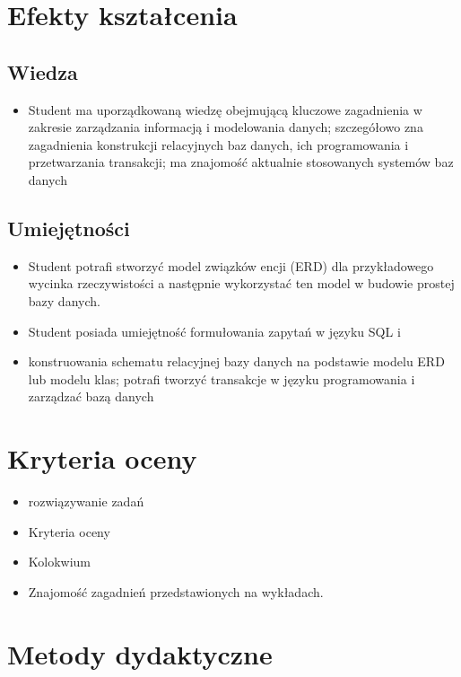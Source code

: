 \documentclass[12pt, a4paper]{article}
\begin{document}
\section{Efekty kształcenia}

\subsection*{Wiedza}
\begin{itemize}
  \item Student ma uporządkowaną wiedzę obejmującą kluczowe zagadnienia w zakresie zarządzania informacją i modelowania danych; szczegółowo zna zagadnienia konstrukcji relacyjnych baz danych, ich programowania i przetwarzania transakcji; ma znajomość aktualnie stosowanych systemów baz danych
\end{itemize}

\subsection*{Umiejętności}
\begin{itemize}
  \item Student potrafi stworzyć model związków encji (ERD) dla przykładowego wycinka rzeczywistości a następnie wykorzystać ten model w budowie prostej bazy danych.
  \item Student posiada umiejętność formułowania zapytań w języku SQL i
  \item konstruowania schematu relacyjnej bazy danych na podstawie modelu ERD lub modelu klas; potrafi tworzyć transakcje w języku programowania i zarządzać bazą danych
\end{itemize}

\section{Kryteria oceny}

\begin{itemize}
  \item rozwiązywanie zadań
  \item Kryteria oceny
  \item Kolokwium
  \item Znajomość zagadnień przedstawionych na wykładach.
\end{itemize}

\section{Metody dydaktyczne}
\end{document}
